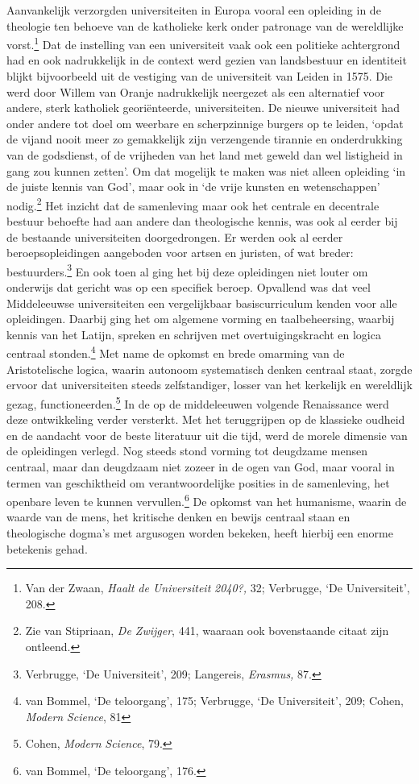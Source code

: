 \documentclass[smallauthor, chapterhaspagenum, nochapterinheader, pagenuminheader,  bigchapnum,medium2, tocpages, garamond, titleinheader]{jote-book}
\begin{document}
	Aanvankelijk verzorgden universiteiten in Europa vooral een opleiding in de theologie ten behoeve van de katholieke kerk onder patronage van de wereldlijke vorst.\footnote{Van der Zwaan, \emph{Haalt de Universiteit }\emph{2040?,} 32; Verbrugge, ‘De Universiteit', 208.} Dat de instelling van een universiteit vaak ook een politieke achtergrond had en ook nadrukkelijk in de context werd gezien van landsbestuur en identiteit blijkt bijvoorbeeld uit de vestiging van de universiteit van Leiden in 1575. Die werd door Willem van Oranje nadrukkelijk neergezet als een alternatief voor andere, sterk katholiek georiënteerde, universiteiten. De nieuwe universiteit had onder andere tot doel om weerbare en scherpzinnige burgers op te leiden, ‘opdat de vijand nooit meer zo gemakkelijk zijn verzengende tirannie en onderdrukking van de godsdienst, of de vrijheden van het land met geweld dan wel listigheid in gang zou kunnen zetten'. Om dat mogelijk te maken was niet alleen opleiding ‘in de juiste kennis van God', maar ook in ‘de vrije kunsten en wetenschappen' nodig.\footnote{Zie van Stipriaan, \emph{De Zwijger}, 441, waaraan ook bovenstaande citaat zijn ontleend.} Het inzicht dat de samenleving maar ook het centrale en decentrale bestuur behoefte had aan andere dan theologische kennis, was ook al eerder bij de bestaande universiteiten doorgedrongen. Er werden ook al eerder beroepsopleidingen aangeboden voor artsen en juristen, of wat breder: bestuurders.\footnote{Verbrugge, ‘De Universiteit', 209; Langereis, \emph{Erasmus}\emph{, }87.} En ook toen al ging het bij deze opleidingen niet louter om onderwijs dat gericht was op een specifiek beroep. Opvallend was dat veel Middeleeuwse universiteiten een vergelijkbaar basiscurriculum kenden voor alle opleidingen. Daarbij ging het om algemene vorming en taalbeheersing, waarbij kennis van het Latijn, spreken en schrijven met overtuigingskracht en logica centraal stonden.\footnote{van Bommel, ‘De teloorgang', 175; Verbrugge, ‘De Universiteit', 209; Cohen, \emph{Modern }\emph{Science}, 81} Met name de opkomst en brede omarming van de Aristotelische logica, waarin autonoom systematisch denken centraal staat, zorgde ervoor dat universiteiten steeds zelfstandiger, losser van het kerkelijk en wereldlijk gezag, functioneerden.\footnote{Cohen, \emph{Modern }\emph{Science}, 79.} In de op de middeleeuwen volgende Renaissance werd deze ontwikkeling verder versterkt. Met het teruggrijpen op de klassieke oudheid en de aandacht voor de beste literatuur uit die tijd, werd de morele dimensie van de opleidingen verlegd. Nog steeds stond vorming tot deugdzame mensen centraal, maar dan deugdzaam niet zozeer in de ogen van God, maar vooral in termen van geschiktheid om verantwoordelijke posities in de samenleving, het openbare leven te kunnen vervullen.\footnote{van Bommel, ‘De teloorgang', 176.} De opkomst van het humanisme, waarin de waarde van de mens, het kritische denken en bewijs centraal staan en theologische dogma's met argusogen worden bekeken, heeft hierbij een enorme betekenis gehad.
\end{document}
